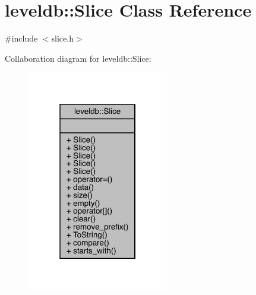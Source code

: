 \hypertarget{classleveldb_1_1_slice}{}\section{leveldb\+::Slice Class Reference}
\label{classleveldb_1_1_slice}


{\ttfamily \#include $<$slice.\+h$>$}



Collaboration diagram for leveldb\+::Slice\+:
\nopagebreak
\begin{figure}[H]
\begin{center}
\leavevmode
\includegraphics[width=175pt]{classleveldb_1_1_slice__coll__graph}
\end{center}
\end{figure}
